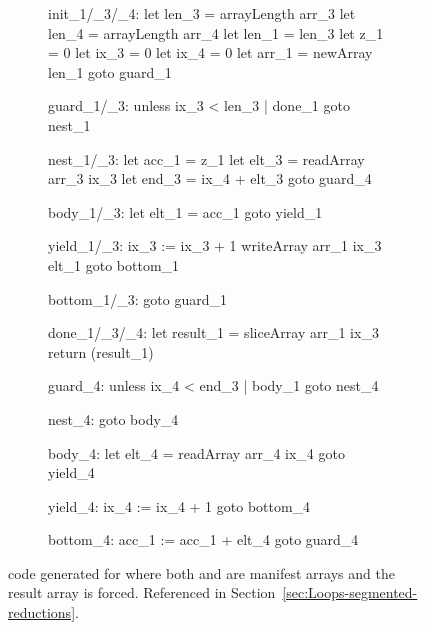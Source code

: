 \documentclass[preamble.tex]{subfiles}
\begin{document}
\begin{figure}[ht!]

\begin{subfigure}{.55\textwidth}
\begin{loopcode}[%
  literate=
    {_1}{{\sub{fold}}}3
    {_3}{{\sub{segd}}}3
    {_4}{{\sub{data}}}3,
]
init_1/_3/_4:
  let len_3 = arrayLength arr_3
  let len_4 = arrayLength arr_4
  let len_1 = len_3
  let z_1 = 0
  let ix_3 = 0
  let ix_4 = 0
  let arr_1 = newArray len_1
  goto guard_1

guard_1/_3:
  unless ix_3 < len_3 | done_1
  goto nest_1

nest_1/_3:
  let acc_1 = z_1
  let elt_3 = readArray arr_3 ix_3
  let end_3 = ix_4 + elt_3
  goto guard_4

body_1/_3:
  let elt_1 = acc_1
  goto yield_1

yield_1/_3:
  ix_3 := ix_3 + 1
  writeArray arr_1 ix_3 elt_1
  goto bottom_1

bottom_1/_3:
  goto guard_1

done_1/_3/_4:
  let result_1 = sliceArray arr_1 ix_3
  return (result_1)
\end{loopcode}
\end{subfigure}%
%
\begin{subfigure}{.45\textwidth}
\begin{loopcode}[%
  literate=
    {_1}{{\sub{fold}}}3
    {_3}{{\sub{segd}}}3
    {_4}{{\sub{data}}}3,
]
guard_4:
  unless ix_4 < end_3 | body_1
  goto nest_4

nest_4:
  goto body_4

body_4:
  let elt_4 = readArray arr_4 ix_4
  goto yield_4

yield_4:
  ix_4 := ix_4 + 1
  goto bottom_4

bottom_4:
  acc_1 := acc_1 + elt_4
  goto guard_4
\end{loopcode}
\end{subfigure}

\caption{\Loop code generated for  where both  and  are manifest arrays and the result array is forced. Referenced in Section~\ref{sec:Loops-segmented-reductions}.}
\label{fig:Loop-fold-s-complete}
\end{figure}
\end{document}
